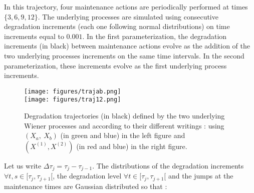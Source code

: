 In this trajectory, four maintenance actions are periodically performed at times $\{3,6,9,12\}$. The underlying processes are simulated using consecutive degradation increments (each one following normal distributions) on time increments equal to $0.001$. In the first parameterization, the degradation increments (in black) between maintenance actions evolve as the addition of the two underlying processes increments on the same time intervals. In the second parameterization, these increments evolve as the first underlying process increments.\\ 






\begin{figure}[h!]
\begin{multicols}{2}
\texttt{[image: figures/trajab.png]} \\
\texttt{[image: figures/traj12.png]} 
\end{multicols}
\caption{Degradation trajectories (in black) defined by the two underlying Wiener processes and according to their different writings : using $(X_a,\ X_b)$  (in green and blue) in the left figure and $(X^{(1)} ,X^{(2)})$ (in red and blue) in the right figure.}
\label{traj}
\end{figure}

Let us write $\Delta \tau_j=\tau_j-\tau_{j-1}$. The distributions of the degradation increments  $\forall t, s \in  [\tau_j,\tau_{j+1}[$, the degradation level  $\forall t \in [\tau_j,\tau_{j+1}[$ and the jumps at the maintenance times are Gaussian distributed so that : 

